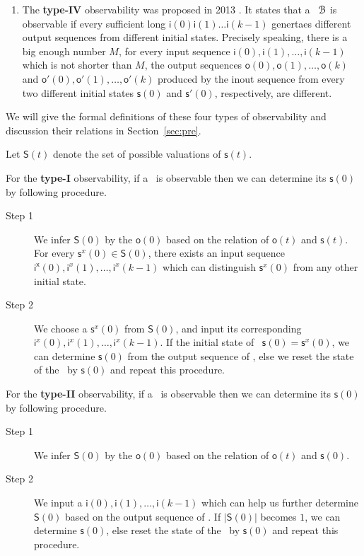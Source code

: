 \begin{enumerate}
\item  The  {\bf type-IV}  observability was  proposed in 2013 \cite{Fornasini2013Observability}. It states that a \BCN\ ${\mathcal{B}}$ is observable if every sufficient long $\mathsf{i}(0)$$\mathsf{i}(1)\ldots$$\mathsf{i}(k-1)$ genertaes different output sequences  from different initial states. Precisely speaking, there is a big enough number $M$, for every  input sequence $\mathsf{i}(0),\mathsf{i}(1),\ldots, \mathsf{i}(k-1)$ which is not shorter than $M$, the output sequences $\mathsf{o}(0), \mathsf{o}(1), \ldots, \mathsf{o}(k)$ and  $\mathsf{o}'(0), \mathsf{o}'(1), \ldots, \mathsf{o}'(k)$ produced by the inout sequence from every two different initial states $\mathsf{s}(0)$ and $\mathsf{s}'(0)$, respectively, are different.
\end{enumerate}
 We will give the formal definitions of these four types of observability and discussion their relations in Section~\ref{sec:pre}.

Let $\mathsf{S}(t)$ denote the set of possible valuations of $\mathsf{s}(t)$.

For the {\bf type-I} observability, if a \BCN\ is observable then we can determine its $\mathsf{s}(0)$ by following procedure. 
\begin{description}
	\item[Step 1] We infer $\mathsf{S}(0)$ by the $\mathsf{o}(0)$ based on the relation of $\mathsf{o}(t)$ and $\mathsf{s}(t)$. For every $\mathsf{s}^x (0)\in\mathsf{S}(0)$, there exists an input sequence $\mathsf{i^x }(0),\mathsf{i}^x (1),\ldots,\mathsf{i}^x (k-1)$ which can distinguish $\mathsf{s}^x (0)$ from any other initial state.
	\item[Step 2] We choose a $\mathsf{s}^x (0)$ from $\mathsf{S}(0)$, and input its corresponding $\mathsf{i}^x (0),\mathsf{i}^x (1),\ldots,\mathsf{i}^x (k-1)$. If the initial state of \BCN\ $\mathsf{s}(0)=\mathsf{s}^x (0)$, we can determine $\mathsf{s}(0)$ from the output sequence of \BCN, else we reset the state of the \BCN\ by $\mathsf{s}(0)$ and repeat this procedure.
	
\end{description}

 For the {\bf type-II} observability, if a \BCN\ is observable then we can determine its $\mathsf{s}(0)$ by following procedure. 
\begin{description}
	\item[Step 1] We infer $\mathsf{S}(0)$ by the $\mathsf{o}(0)$ based on the relation of $\mathsf{o}(t)$ and $\mathsf{s}(0)$. 
	\item[Step 2] We input a $\mathsf{i}(0),\mathsf{i}(1),\ldots,\mathsf{i}(k-1)$ which can help us further determine $\mathsf{S}(0)$ based on the output sequence of \BCN. If $|\mathsf{S}(0)|$ becomes $1$, we can determine $\mathsf{s}(0)$, else reset the state of the \BCN\ by $\mathsf{s}(0)$ and repeat this procedure.
\end{description}

